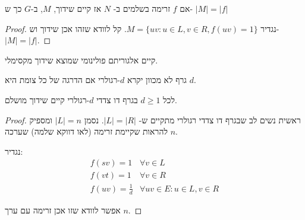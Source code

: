 \begin{claim}
אם $f$ זרימה בשלמים ב-%
$N$
אז קיים שידוך, $M$, ב-$G$ כך ש-%
$|M| = |f|$
\end{claim}

\begin{proof}
נגדיר
$M = \{uv : u \in L, v \in R, f(uv) = 1\}$.
קל לוודא שזהו אכן שידוך וש-%
$|M| = |f|$.
\end{proof}

\begin{corollary}
קיים אלגוריתם פולינומי שמוצא שידוך מקסימלי.
\end{corollary}

\begin{definition}
גרף לא מכוון יקרא $d$-רגולרי אם הדרגה של כל צומת היא $d$.
\end{definition}

\begin{claim}
לכל 
$d \geq 1$
בגרף דו צדדי $d$-רגולרי קיים שידוך מושלם.
\end{claim}

\begin{proof}
ראשית נשים לב שבגרף דו צדדי רגולרי מתקיים ש-%
$|L| = |R|$.
נסמן 
$|L| = n$
ומספיק להראות שקיימת זרימה (לאו דווקא שלמה) שערכה
$n$.

נגדיר:
$$
\begin{array}{ll}
f(sv) = 1 & \forall v \in L
\\
f(vt) = 1 & \forall v \in R
\\
f(uv) = \frac{1}{d} & \forall uv \in E : u \in L, v \in R
\end{array}
$$

אפשר לוודא שזו אכן זרימה עם ערך $n$.
\end{proof}
